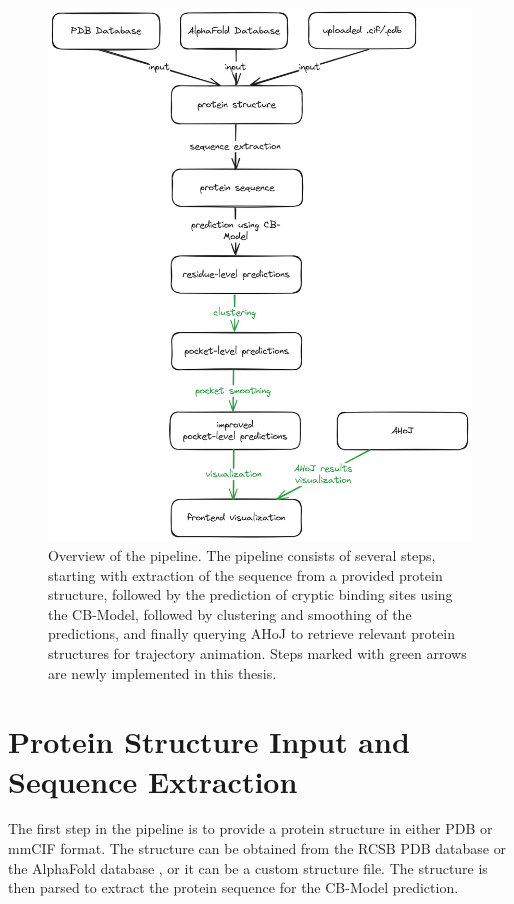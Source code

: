 \begin{figure}[htbp]
    \centering
    \includegraphics[width=\textwidth]{img/methodology-overview.png}
    \caption{Overview of the pipeline. The pipeline consists of several steps, starting with extraction of the sequence from a provided protein structure, followed by the prediction of cryptic binding sites using the CB-Model, followed by clustering and smoothing of the predictions, and finally querying AHoJ to retrieve relevant protein structures for trajectory animation. Steps marked with green arrows are newly implemented in this thesis.}
    \label{fig:pipeline-overview}
\end{figure}

\section{Protein Structure Input and Sequence Extraction}
\label{sec:structure-input}

The first step in the pipeline is to provide a protein structure in either PDB or mmCIF format. The structure can be obtained from the RCSB PDB database \cite{berman2000protein} or the AlphaFold database \cite{jumper2021highly}, or it can be a custom structure file. The structure is then parsed to extract the protein sequence for the CB-Model prediction.

